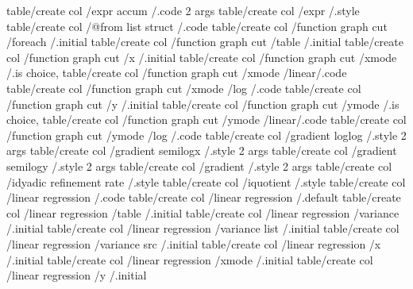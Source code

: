 table/create col                   /expr accum                                  /.code 2 args 
table/create col                   /expr                                        /.style       
table/create col                   /@from list struct                           /.code        
table/create col                   /function graph cut     /foreach             /.initial     
table/create col                   /function graph cut     /table               /.initial     
table/create col                   /function graph cut     /x                   /.initial     
table/create col                   /function graph cut     /xmode               /.is choice,  
table/create col                   /function graph cut     /xmode        /linear/.code        
table/create col                   /function graph cut     /xmode        /log   /.code        
table/create col                   /function graph cut     /y                   /.initial     
table/create col                   /function graph cut     /ymode               /.is choice,  
table/create col                   /function graph cut     /ymode        /linear/.code        
table/create col                   /function graph cut     /ymode        /log   /.code        
table/create col                   /gradient loglog                             /.style 2 args
table/create col                   /gradient semilogx                           /.style 2 args
table/create col                   /gradient semilogy                           /.style 2 args
table/create col                   /gradient                                    /.style 2 args
table/create col                   /idyadic refinement rate                     /.style       
table/create col                   /iquotient                                   /.style       
table/create col                   /linear regression                           /.code        
table/create col                   /linear regression                           /.default     
table/create col                   /linear regression      /table               /.initial     
table/create col                   /linear regression      /variance            /.initial     
table/create col                   /linear regression      /variance list       /.initial     
table/create col                   /linear regression      /variance src        /.initial     
table/create col                   /linear regression      /x                   /.initial     
table/create col                   /linear regression      /xmode               /.initial     
table/create col                   /linear regression      /y                   /.initial     
